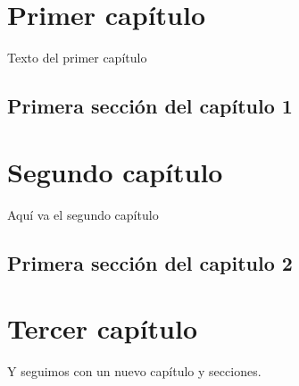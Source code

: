 \documentclass[12pt,letterpaper]{report}
\begin{document}
\tableofcontents

\chapter{Primer capítulo}
Texto del primer capítulo

\section{Primera sección del capítulo 1}

\chapter{Segundo capítulo}
Aquí va el segundo capítulo

\section{Primera sección del capitulo 2}

\chapter{Tercer capítulo}
Y seguimos con un nuevo capítulo y secciones.
\end{document}
